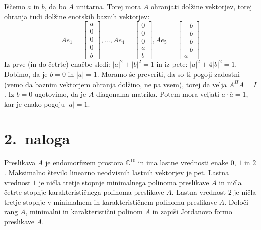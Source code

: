 \documentclass[a4,11pt]{article}
\begin{document}
    Iščemo \(a\) in \(b\), da bo \(A\) unitarna. Torej mora \(A\) ohranjati dolžine vektorjev, torej ohranja tudi dolžine enotskih baznih vektorjev:
    \[Ae_1 = \begin{bmatrix}
        a \\ 0 \\ 0 \\ 0 \\ b
    \end{bmatrix}, \dots, Ae_4 = \begin{bmatrix}
        0 \\ 0 \\ 0 \\ a \\ b
    \end{bmatrix}, Ae_5 = \begin{bmatrix}
        -b \\ -b \\ -b \\ -b \\ a
    \end{bmatrix}\]
    Iz prve (in do četrte) enačbe sledi: \({|a|^2} + {|b|}^2 = 1\) in iz pete: \({|a|^2} + 4{|b|}^2 = 1\). Dobimo, da je
    \(b = 0\) in \(|a| = 1\). Moramo še preveriti, da so ti pogoji zadostni (vemo da baznim vektorjem ohranja dolžino, ne pa vsem),
    torej da velja \(A^H A = I\). Iz \(b = 0\) ugotovimo, da je \(A\) diagonalna matrika.
    Potem mora veljati \(a \cdot \overline{a} = 1\), kar je enako pogoju \(|a| = 1\).

\section*{2.~naloga}
    Preslikava \(A\) je endomorfizem prostora \(\mathbb{C}^{10}\)
    in ima lastne vrednosti enake \(0\), \(1\) in \(2\). Maksimalno število linearno neodvisnih lastnih vektorjev je
    pet. Lastna vrednost \(1\) je ničla tretje stopnje minimalnega polinoma preslikave
    \(A\) in ničla četrte stopnje karakterističnega polinoma preslikave \(A\).
    Lastna vrednost \(2\) je ničla tretje stopnje v minimalnem in karakterističnem
    polinomu preslikave \(A\).
    Določi rang \(A\), minimalni in karakteristični polinom \(A\) in zapiši Jordanovo
    formo preslikave \(A\).
\end{document}
